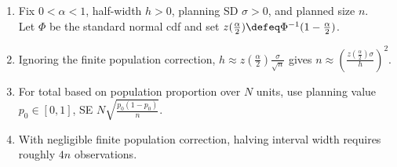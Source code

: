 \begin{method} \label{meth:srs-sample-size-from-half-width} 
\begin{enumerate}[label=(\roman*)]
\setlength{\itemsep}{0pt}
\item Fix $0<\alpha<1$, half-width $h>0$, planning SD $\sigma>0$, and planned size $n$.\\
Let $\Phi$ be the standard normal cdf and set $z(\frac{\alpha}{2})\defeq\Phi^{-1}(1-\frac{\alpha}{2})$.
\item Ignoring the finite population correction, $h\approx z(\frac{\alpha}{2})\frac{\sigma}{\sqrt n}$ gives $n\approx\left(\frac{z(\frac{\alpha}{2})\sigma}{h}\right)^2$.
\item For total based on population proportion over $N$ units, use planning value $p_0\in[0,1]$, SE $N\sqrt{\frac{p_0(1-p_0)}{n}}$.
\item With negligible finite population correction, halving interval width requires roughly $4n$ observations.
\end{enumerate}
\end{method}
